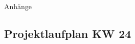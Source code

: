 %
%
%
\begin{appendix}

\newpage

\begin{center}
	\huge{Anhänge}
\end{center}

\normalsize

\newpage
\begin{landscape}
	\section{Projektlaufplan KW 24}
	\label{sec:projectplan}
	\scalebox{.75}{
		
		}
\end{landscape}


\end{appendix}
